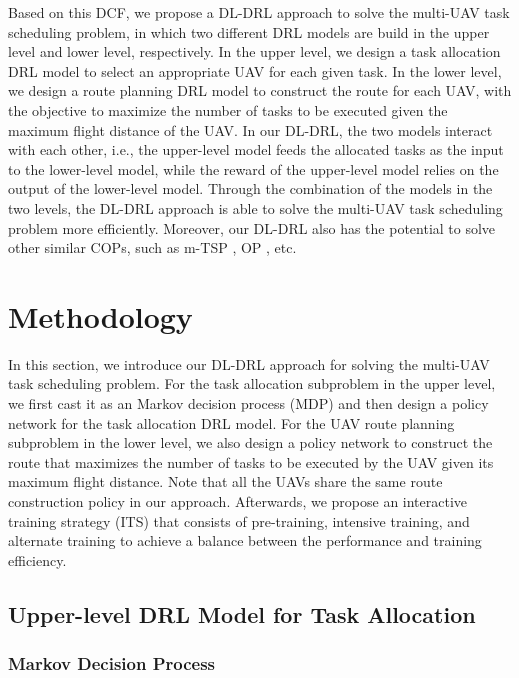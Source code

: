\documentclass[lettersize,journal]{IEEEtran}
\begin{document}
	Based on this DCF, we propose a DL-DRL approach to solve the multi-UAV task scheduling problem, in which two different DRL models are build in the upper level and lower level, respectively. In the upper level, we design a task allocation DRL model to select an appropriate UAV for each given task. In the lower level, we design a route planning DRL model to construct the route for each UAV, with the objective to maximize the number of tasks to be executed given the maximum flight distance of the UAV. In our DL-DRL, the two models interact with each other, i.e., the upper-level model feeds the allocated tasks as the input to the lower-level model, while the reward of the upper-level model relies on the output of the lower-level model. Through the combination of the models in the two levels, the DL-DRL approach is able to solve the multi-UAV task scheduling problem more efficiently. Moreover, our DL-DRL also has the potential to solve other similar COPs, such as m-TSP \cite{xuTwoPhaseHeuristic2018}, OP \cite{dolinskayaAdaptiveOrienteeringProblem2018}, etc.
	
	
	
	\section{Methodology}
	
	In this section, we introduce our DL-DRL approach for solving the multi-UAV task scheduling problem. For the task allocation subproblem in the upper level, we first cast it as an Markov decision process (MDP) and then design a policy network for the task allocation DRL model. For the UAV route planning subproblem in the lower level, we also design a policy network to construct the route that maximizes the number of tasks to be executed by the UAV given its maximum flight distance. Note that all the UAVs share the same route construction policy in our approach. Afterwards, we propose an interactive training strategy (ITS) that consists of pre-training, intensive training, and alternate training to achieve a balance between the performance and training efficiency.
	
	\subsection{Upper-level DRL Model for Task Allocation}
	
	\subsubsection{Markov Decision Process}
	
\end{document}
